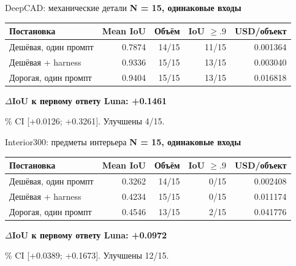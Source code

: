\begin{frame}{DeepCAD: механические детали}\relax
\textbf{N = 15, одинаковые входы}
\par\medskip
{\smalltext
\begin{tabular}{@{}L{.33\textwidth}rrrr@{}}
\toprule
\textbf{Постановка} & \textbf{Mean IoU} & \textbf{Объём} & \textbf{IoU $\geq.9$} & \textbf{USD/объект}\\
\midrule
Дешёвая, один промпт & 0.7874 & 14/15 & 11/15 & 0.001364 \\
Дешёвая + harness & 0.9336 & 15/15 & 13/15 & 0.003040 \\
Дорогая, один промпт & 0.9404 & 15/15 & 13/15 & 0.016818 \\
\bottomrule
\end{tabular}}
\par\bigskip
\textbf{$\Delta$IoU к первому ответу Luna: +0.1461}
\par{}\% CI [+0.0126; +0.3261]. Улучшены 4/15.
\par{}
\end{frame}
\begin{frame}{Interior300: предметы интерьера}\relax
\textbf{N = 15, одинаковые входы}
\par\medskip
{\smalltext
\begin{tabular}{@{}L{.33\textwidth}rrrr@{}}
\toprule
\textbf{Постановка} & \textbf{Mean IoU} & \textbf{Объём} & \textbf{IoU $\geq.9$} & \textbf{USD/объект}\\
\midrule
Дешёвая, один промпт & 0.3262 & 14/15 & 0/15 & 0.002408 \\
Дешёвая + harness & 0.4234 & 15/15 & 0/15 & 0.011174 \\
Дорогая, один промпт & 0.4546 & 13/15 & 2/15 & 0.041776 \\
\bottomrule
\end{tabular}}
\par\bigskip
\textbf{$\Delta$IoU к первому ответу Luna: +0.0972}
\par{}\% CI [+0.0389; +0.1673]. Улучшены 12/15.
\par{}
\end{frame}
